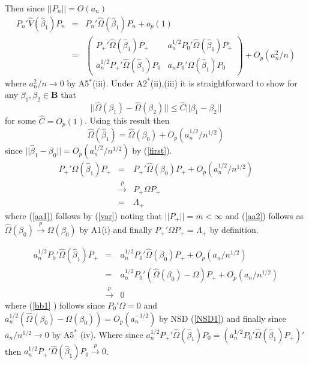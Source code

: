 \documentclass[11pt, fleqn]{article}
\begin{document}
Then since $|\!|P_n|\!|=O(a_n)$ 
\begin{eqnarray}
P_n'\hat{V}(\hat{\beta}_1)P_n&=&P_n'\hat{\Omega}(\hat{\beta}_1)P_n +o_p(1) \\
&=&  \label{wa}\left(\begin{array}{cc} P_+'\hat{\Omega}(\hat{\beta}_1)P_+ & a_n^{1/2}P_0'\hat{\Omega}(\hat{\beta}_1)P_+ \\
a_n^{1/2}P_+'\hat{\Omega}(\hat{\beta}_1)P_0 & 
a_nP_0'\hat{\Omega}(\hat{\beta}_1)P_0\end{array} \right)+O_p(a_n^2/n)
\end{eqnarray}
where $a_n^2/n\rightarrow 0$ by A5$^*$(iii).
Under A$2^*$(ii),(iii) it is straightforward to show for any $\beta_1,\beta_2 \in \mathbf{B}$ that
\begin{equation}
|\!|\hat{\Omega}(\beta_1)-\hat{\Omega}(\beta_2)|\!|\leq \hat{C}|\!|\beta_1-\beta_2|\!| \end{equation}
for some $\hat{C}=O_p(1)$. Using this result then
\begin{equation}\label{var} \hat{\Omega}(\hat{\beta}_1)=\hat{\Omega}(\beta_0)+ O_p(a_n^{1/2}/n^{1/2}) \end{equation}
since $|\!|\hat{\beta}_1-\beta_0|\!| =O_p(a_n^{1/2}/n^{1/2})$ by (\ref{first}).\\


\begin{eqnarray}
P_+'\hat{\Omega}(\hat{\beta}_1)P_+&=&P_+'\hat{\Omega}(\beta_0)P_+ +O_p(a_n^{1/2}/n^{1/2}) \label{aa1} \\
&\overset{p}{\rightarrow}& P_+\Omega P_+ \label{aa2} \\
&=&\Lambda_+ \end{eqnarray}
where (\ref{aa1}) follows by  (\ref{var}) noting that $|\!|P_+|\!|=\bar{m}<\infty$ and (\ref{aa2}) follows as $\hat{\Omega}(\beta_0)\overset{p}{\rightarrow} \Omega(\beta_0)$ by A1(i) and finally $P_+'\Omega P_+ = \Lambda_+$ by definition.



\begin{eqnarray} 
a_n^{1/2}P_0'\hat{\Omega}(\hat{\beta}_1)P_+
&=&a_n^{1/2}P_0'\hat{\Omega}(\beta_0)P_+ +O_p(a_n/n^{1/2}) 
\label{bb1}  \\
&=&a_n^{1/2}P_0'(\hat{\Omega}(\beta_0)-\Omega)P_+ +O_p(a_n/n^{1/2})\label{bb1} \\
 &\overset{p}{\rightarrow}& 0 \label{bb2} 
 \end{eqnarray}
 where (\ref{bb1} ) follows since $P_0'\Omega=0$ and 
 $a_n^{1/2}(\hat{\Omega}(\beta_0)-\Omega(\beta_0))=O_p(a_n^{-1/2})$ by NSD (\ref{NSD1}) and finally since $a_n/n^{1/2}\rightarrow 0$ by A$5^*$ (iv).
Where since $a_n^{1/2}P_+'\hat{\Omega}(\hat{\beta}_1)P_0=(a_n^{1/2}P_0'\hat{\Omega}(\hat{\beta}_1)P_+)'$ then $a_n^{1/2}P_+'\hat{\Omega}(\hat{\beta}_1)P_0 \overset{p}{\rightarrow} 0$.
\end{document}
